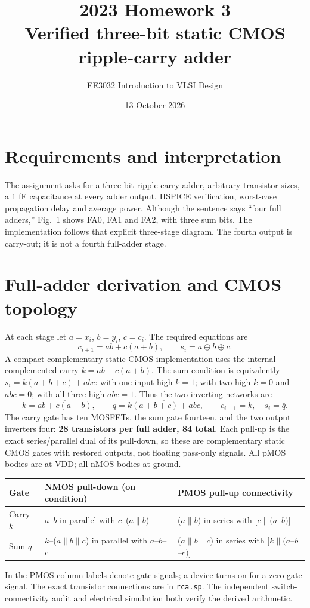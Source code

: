 \documentclass[11pt,a4paper]{article}
\title{2023 Homework 3\\Verified three-bit static CMOS ripple-carry adder}
\author{EE3032 Introduction to VLSI Design}\date{13 October 2026}
\begin{document}
\maketitle
\section*{Requirements and interpretation}
The assignment asks for a three-bit ripple-carry adder, arbitrary transistor
sizes, a 1 fF capacitance at every adder output, HSPICE verification,
worst-case propagation delay and average power. Although the sentence says
``four full adders,'' Fig.~1 shows FA0, FA1 and FA2, with three sum bits.
The implementation follows that explicit three-stage diagram. The fourth
output is carry-out; it is not a fourth full-adder stage.

\section*{Full-adder derivation and CMOS topology}
At each stage let $a=x_i$, $b=y_i$, $c=c_i$. The required equations are
\[
 c_{i+1}=ab+c(a+b),\qquad s_i=a\oplus b\oplus c.
\]
A compact complementary static CMOS implementation uses the internal
complemented carry $k=\overline{ab+c(a+b)}$.
The sum condition is equivalently $s_i=k(a+b+c)+abc$:
with one input high $k=1$; with two high $k=0$ and $abc=0$;
with all three high $abc=1$. Thus the two inverting networks are
\[
 k=\overline{ab+c(a+b)},\qquad
 q=\overline{k(a+b+c)+abc},\qquad
 c_{i+1}=\bar k,\quad s_i=\bar q.
\]
The carry gate has ten MOSFETs, the sum gate fourteen, and the two output
inverters four: \textbf{28 transistors per full adder, 84 total}.
Each pull-up is the exact series/parallel dual of its pull-down, so these
are complementary static CMOS gates with restored outputs, not floating
pass-only signals. All pMOS bodies are at VDD; all nMOS bodies at ground.
\begin{center}\begin{tabular}{p{.17\linewidth}p{.34\linewidth}p{.36\linewidth}}
\toprule Gate&NMOS pull-down (on condition)&PMOS pull-up connectivity\\\midrule
Carry $k$&$a$--$b$ in parallel with $c$--($a\parallel b$)
&($a\parallel b$) in series with [$c\parallel(a$--$b)$]\\
Sum $q$&$k$--($a\parallel b\parallel c$) in parallel with $a$--$b$--$c$
&($a\parallel b\parallel c$) in series with [$k\parallel(a$--$b$--$c)$]\\\bottomrule
\end{tabular}\end{center}
In the PMOS column labels denote gate signals; a device turns on for a zero
gate signal. The exact transistor connections are in \texttt{rca.sp}.
The independent switch-connectivity audit and electrical simulation both
verify the derived arithmetic.
\end{document}
